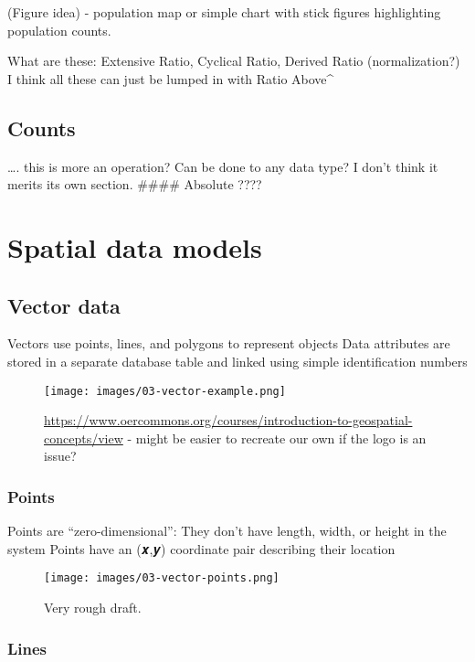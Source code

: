 \documentclass[
]{book}
\begin{document}
(Figure idea) - population map or simple chart with stick figures highlighting population counts.

What are these: Extensive Ratio, Cyclical Ratio, Derived Ratio (normalization?)
I think all these can just be lumped in with Ratio Above\^{}

\hypertarget{counts}{%
\subsection{Counts}\label{counts}}

\ldots. this is more an operation? Can be done to any data type? I don't think it merits its own section.
\#\#\#\# Absolute
????

\hypertarget{spatial-data-models}{%
\section{Spatial data models}\label{spatial-data-models}}

\hypertarget{vector-data}{%
\subsection{Vector data}\label{vector-data}}

Vectors use points, lines, and polygons to represent objects
Data attributes are stored in a separate database table and linked using simple identification numbers

\begin{figure}
\centering
\texttt{[image: images/03-vector-example.png]}
\caption{\url{https://www.oercommons.org/courses/introduction-to-geospatial-concepts/view} - might be easier to recreate our own if the logo is an issue?}
\end{figure}

\hypertarget{points}{%
\subsubsection{Points}\label{points}}

Points are ``zero-dimensional'':
They don't have length, width, or height in the system
Points have an (𝒙,𝒚) coordinate pair describing their location

\begin{figure}
\centering
\texttt{[image: images/03-vector-points.png]}
\caption{Very rough draft.}
\end{figure}

\hypertarget{lines}{%
\subsubsection{Lines}\label{lines}}
\end{document}
